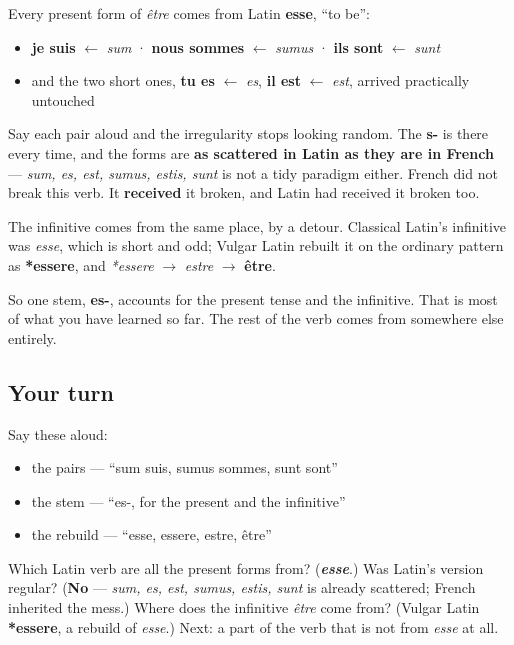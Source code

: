 \begin{cousinweb}
Every present form of \emph{être} comes from Latin \textbf{esse}, \textquotedblleft{}to be\textquotedblright{}:

\begin{itemize}
\raggedright
  \item \textbf{je suis} $\leftarrow$ \emph{sum} · \textbf{nous sommes} $\leftarrow$ \emph{sumus} · \textbf{ils sont} $\leftarrow$ \emph{sunt}
  \item and the two short ones, \textbf{tu es} $\leftarrow$ \emph{es}, \textbf{il est} $\leftarrow$ \emph{est}, arrived practically untouched
\end{itemize}

Say each pair aloud and the irregularity stops looking random. The \textbf{s-} is there every time, and the forms are \textbf{as scattered in Latin as they are in French} — \emph{sum, es, est, sumus, estis, sunt} is not a tidy paradigm either. French did not break this verb. It \textbf{received} it broken, and Latin had received it broken too.

The infinitive comes from the same place, by a detour. Classical Latin's infinitive was \emph{esse}, which is short and odd; Vulgar Latin rebuilt it on the ordinary pattern as \textbf{*essere}, and \emph{*essere} $\to$ \emph{estre} $\to$ \textbf{être}.

So one stem, \textbf{es-}, accounts for the present tense and the infinitive. That is most of what you have learned so far. The rest of the verb comes from somewhere else entirely.
\end{cousinweb}

\subsection*{Your turn}
Say these aloud:

\begin{itemize}
\raggedright
  \item the pairs — \textquotedblleft{}sum suis, sumus sommes, sunt sont\textquotedblright{}
  \item the stem — \textquotedblleft{}es-, for the present and the infinitive\textquotedblright{}
  \item the rebuild — \textquotedblleft{}esse, essere, estre, être\textquotedblright{}
\end{itemize}

\begin{tcolorbox}[breakable,colback=teal!4,colframe=teal!35!black,title={Before you move on}]
Which Latin verb are all the present forms from? (\emph{\textbf{esse}}.) Was Latin's version regular? (\textbf{No} — \emph{sum, es, est, sumus, estis, sunt} is already scattered; French inherited the mess.) Where does the infinitive \emph{être} come from? (Vulgar Latin \textbf{*essere}, a rebuild of \emph{esse}.) Next: a part of the verb that is not from \emph{esse} at all.
\end{tcolorbox}
